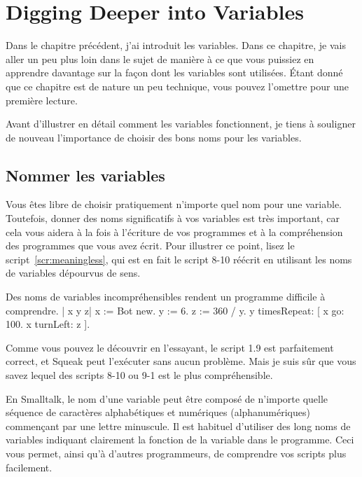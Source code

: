 \documentclass[a4paper,10pt,twoside]{book}
\begin{document}
    \sloppy
\fi

\chapter{Digging Deeper into Variables}\label{cha:deeperVariable}


Dans le chapitre pr\'ec\'edent, j'ai introduit les variables. Dans ce chapitre, je vais aller un peu plus loin dans le sujet de mani\`ere \`a ce que vous puissiez en apprendre davantage sur la fa\c con dont les variables sont utilis\'ees. \'Etant donn\'e que ce chapitre est de nature un peu technique, vous pouvez l'omettre pour une premi\`ere lecture.

Avant d'illustrer en d\'etail comment les variables fonctionnent, je tiens \`a souligner de nouveau l'importance de choisir des bons noms pour les variables. 

\section*{Nommer les variables}

Vous \^etes libre de choisir pratiquement n'importe quel nom pour une variable. Toutefois, donner des noms significatifs \`a vos variables est tr\`es important, car cela vous aidera \`a la fois \`a l'\'ecriture de vos programmes et \`a la compr\'ehension des programmes que vous avez \'ecrit. Pour illustrer ce point, lisez le script~\ref{scr:meaningless}, qui est en fait le script 8-10 r\'e\'ecrit en utilisant les noms de variables d\'epourvus de sens. 

\begin{script}[meaningless]{Des noms de variables incompr\'ehensibles rendent un programme difficile \`a comprendre. }
	| x y z| 
	x := Bot new. 
	y := 6. 
	z := 360 / y. 
	y timesRepeat: 
		[ x go: 100. 
		x turnLeft: z ]. 
\end{script}

Comme vous pouvez le d\'ecouvrir en l'essayant, le script 1.9 est parfaitement correct, et Squeak peut l'ex\'ecuter sans aucun probl\`eme. Mais je suis s\^ur que vous savez lequel des scripts 8-10 ou 9-1 est le plus compr\'ehensible. 


En Smalltalk, le nom d'une variable peut \^etre compos\'e de n'importe quelle s\'equence de caract\`eres alphab\'etiques et num\'eriques (alphanum\'eriques) commen\c cant par une lettre minuscule. Il est habituel d'utiliser des long noms de variables indiquant clairement la fonction de la variable dans le programme. Ceci vous permet, ainsi qu'\`a d'autres programmeurs, de comprendre vos scripts plus facilement. 
\end{document}
